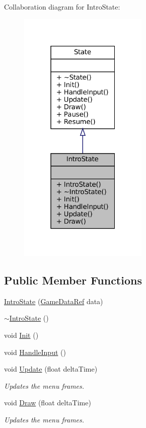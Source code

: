 Collaboration diagram for Intro\+State\+:\nopagebreak
\begin{figure}[H]
\begin{center}
\leavevmode
\includegraphics[width=175pt]{classIntroState__coll__graph}
\end{center}
\end{figure}
\subsection*{Public Member Functions}
\begin{DoxyCompactItemize}
\item 
\mbox{\hyperlink{classIntroState_ab4dc575c648c2589c7b110f5c930601c}{Intro\+State}} (\mbox{\hyperlink{Game_8h_aff850703a7797c8bfee2f02906aec50c}{Game\+Data\+Ref}} data)
\item 
\mbox{\hyperlink{classIntroState_a33fe62d2ddc9d079f716016674090b05}{$\sim$\+Intro\+State}} ()
\item 
void \mbox{\hyperlink{classIntroState_a065e914b336c162b1467845c7126c920}{Init}} ()
\item 
void \mbox{\hyperlink{classIntroState_a6a2a89b3374f53e1bcf366c0ae896109}{Handle\+Input}} ()
\item 
void \mbox{\hyperlink{classIntroState_a781891b1db3bdbf6af228ef85c0df00a}{Update}} (float delta\+Time)
\begin{DoxyCompactList}\small\item\em Updates the menu frames. \end{DoxyCompactList}\item 
void \mbox{\hyperlink{classIntroState_a903b8e2b781eae1e9a6e7db08d38fd2c}{Draw}} (float delta\+Time)
\begin{DoxyCompactList}\small\item\em Updates the menu frames. \end{DoxyCompactList}\end{DoxyCompactItemize}


